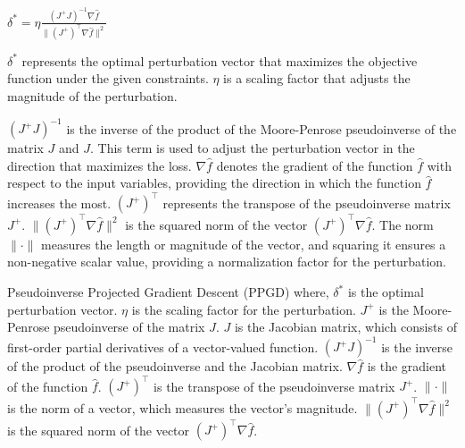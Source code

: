 $\delta^* = \eta \frac{\left( J^+J \right)^{-1} \nabla \hat{f}}{\| (J^+)^{\top} \nabla \hat{f} \|^2}$

$\delta^*$ represents the optimal perturbation vector that maximizes the objective function under the given constraints. $\eta$ is a scaling factor that adjusts the magnitude of the perturbation.

$\left( J^+J \right)^{-1}$ is the inverse of the product of the Moore-Penrose pseudoinverse of the matrix $J$ and $J$. This term is used to adjust the perturbation vector in the direction that maximizes the loss.
$\nabla \hat{f}$ denotes the gradient of the function $\hat{f}$ with respect to the input variables, providing the direction in which the function $\hat{f}$ increases the most.
$(J^+)^{\top}$ represents the transpose of the pseudoinverse matrix $J^+$.
$\| (J^+)^{\top} \nabla \hat{f} \|^2$ is the squared norm of the vector $(J^+)^{\top} \nabla \hat{f}$. The norm $\| \cdot \|$ measures the length or magnitude of the vector, and squaring it ensures a non-negative scalar value, providing a normalization factor for the perturbation.

Pseudoinverse Projected Gradient Descent (PPGD) where, $\delta^*$ is the optimal perturbation vector. $\eta$ is the scaling factor for the perturbation. $J^+$ is the Moore-Penrose pseudoinverse of the matrix $J$. $J$ is the Jacobian matrix, which consists of first-order partial derivatives of a vector-valued function. $\left( J^+J \right)^{-1}$ is the inverse of the product of the pseudoinverse and the Jacobian matrix. $\nabla \hat{f}$ is the gradient of the function $\hat{f}$. $(J^+)^{\top}$ is the transpose of the pseudoinverse matrix $J^+$. $\| \cdot \|$ is the norm of a vector, which measures the vector's magnitude. $\| (J^+)^{\top} \nabla \hat{f} \|^2$ is the squared norm of the vector $(J^+)^{\top} \nabla \hat{f}$.
